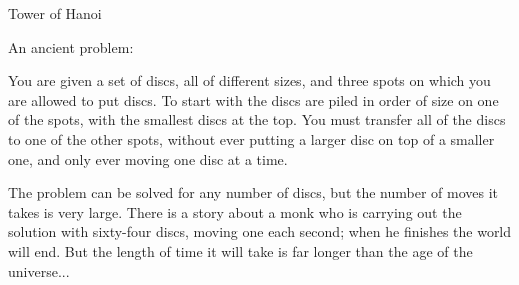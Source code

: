 Tower of Hanoi

\par
An ancient problem:
\par
You are given a set of discs, all of different sizes, and three
spots on which you are allowed to put discs. To start with the discs
are piled in order of size on one of the spots, with the smallest
discs at the top. You must transfer all of the discs to one of the
other spots, without ever putting a larger disc on top of a smaller
one, and only ever moving one disc at a time.
\par
The problem can be solved for any number of discs, but the number of
moves it takes is very large. There is a story about a monk who is
carrying out the solution with sixty-four discs, moving one each second;
when he finishes the world will end. But the length of time it will
take is far longer than the age of the universe...